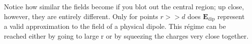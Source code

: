 \documentclass[../../../main.tex]{subfiles}
\begin{document}
Notice how similar the fields become if you blot out the central region; up close, however, they are entirely different. Only for points $r >> d$ does $\mathbf{E}_{\text{dip}}$ represent a valid approximation to the field of a physical dipole. This régime can be reached either by going to large r or by squeezing the charges very close together.
\end{document}
